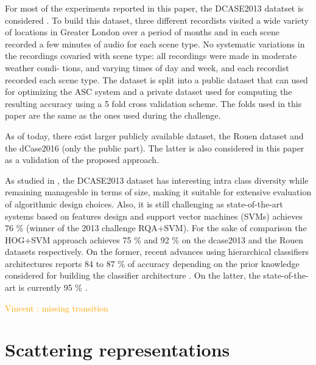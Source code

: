 \documentclass[journal]{IEEEtran}
\newcommand{\vl}[1]{\textcolor{orange}{Vincent : #1}}
\begin{document}

For most of the experiments reported in this paper, the DCASE2013 datatset is considered \cite{giannoulis2013database, 7100934}. To build this dataset, three different recordists visited a wide variety of locations in Greater London over
a period of months and in each
scene recorded a few minutes of audio for each scene type. No
systematic variations in the recordings covaried with scene
type: all recordings were made in moderate weather condi-
tions, and varying times of day and week, and each recordist
recorded each scene type. The dataset is split into a public dataset that can used for optimizing the ASC system and a private dataset used for computing the resulting accuracy using a 5 fold cross validation scheme. The folds used in this paper are the same as the ones used during the challenge.

As of today, there exist larger publicly available dataset, the
Rouen dataset \cite{rakotomamonjy2015histogram} and the dCase2016 \cite{Mesaros2016_EUSIPCO} (only the public part). The latter is also considered in this paper as a validation of the proposed approach.

As studied in \cite{lagrange:hal-01082501}, the DCASE2013 dataset has interesting intra class diversity while remaining manageable in terms of size, making it suitable for extensive evaluation of algorithmic design choices. Also, it is still challenging as state-of-the-art systems based on features design and support vector machines (SVMs) achieves 76 \% \cite{roma2013} (winner of the 2013 challenge RQA+SVM). For the sake of comparison the HOG+SVM approach \cite{rakotomamonjy2015histogram} achieves 75 \% and 92 \% on the dcase2013 and the Rouen datasets respectively. On the former, recent advances using hierarchical classifiers architectures reports 84 to 87 \% of accuracy depending on the prior knowledge considered for building the classifier architecture \cite{phan2016label}. On the latter, the state-of-the-art is currently 95 \% \cite{bisot2016acoustic}. 

\vl{missing transition}

\section{Scattering representations \label{sec:scattering}}
\end{document}
